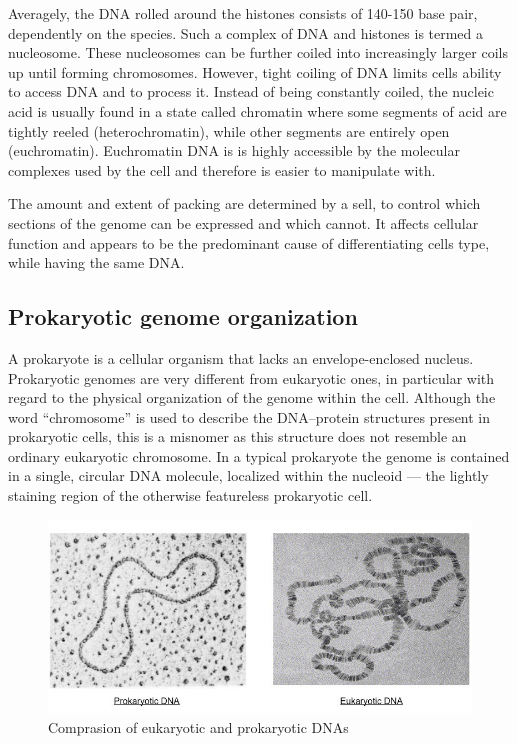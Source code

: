 Averagely, the DNA rolled around the histones consists of 140-150 base pair, dependently on the species. 
Such a complex of DNA and histones is termed a nucleosome. 
These nucleosomes can be further coiled into increasingly larger coils up until forming chromosomes. 
However, tight coiling of DNA limits cells ability to access DNA and to process it.
Instead of being constantly coiled, the nucleic acid is usually found in a state called chromatin where some segments of acid are tightly reeled (heterochromatin), while other segments are entirely open (euchromatin). 
Euchromatin DNA is is highly accessible by the molecular complexes used by the cell and therefore is easier to manipulate with. 

The amount and extent of packing are determined by a sell, to control which sections of the genome can be expressed and which cannot. 
It affects cellular function and appears to be the predominant cause of differentiating cells type, while having the same DNA.

\subsection{Prokaryotic genome organization}
A prokaryote is a cellular organism that lacks an envelope-enclosed nucleus.
Prokaryotic genomes are very different from eukaryotic ones, in particular with regard to the physical organization of the genome within the cell.
Although the word “chromosome” is used to describe the DNA–protein structures present in prokaryotic cells, this is a misnomer as this structure does not resemble an ordinary eukaryotic chromosome.
In a typical prokaryote the genome is contained in a single, circular DNA molecule, localized within the nucleoid — the lightly staining region of the otherwise featureless prokaryotic cell.

\begin{figure}[!ht]
	\centering
	\includegraphics[width=\textwidth]{figures/pro-vs-eu-dna_med.jpeg}
	\caption{Comprasion of eukaryotic and prokaryotic DNAs \label{o:latex_friendly_zone}}
\end{figure}

